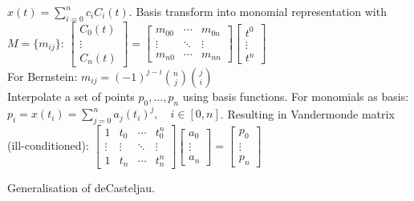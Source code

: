  $x(t) = \sum_{i=0}^nc_iC_i(t)$. Basis transform into monomial representation with $M=\{m_{ij}\}$:
$
\begin{bmatrix}
C_0(t) \\
\vdots \\
C_n(t)
\end{bmatrix}
=
\begin{bmatrix}
m_{00} & \cdots & m_{0n} \\
\vdots & \ddots & \vdots \\
m_{n0} & \cdots & m_{nn}
\end{bmatrix}
\begin{bmatrix}
t^0 \\
\vdots \\
t^n
\end{bmatrix}
$
\\
For Bernstein: $m_{ij} = (-1)^{j-i} \binom{n}{j} \binom{j}{i}$
\\
 Interpolate a set of points $p_0, ..., p_n$ using basis functions. For monomials as basis: $p_i = x(t_i) = \sum_{j=0}^{n} a_j(t_i)^j, \quad i \in [0,n]$. Resulting in Vandermonde matrix (ill-conditioned): 
$
\begin{bmatrix}
1 & t_0 & \cdots & t_0^n \\
\vdots & \vdots & \ddots & \vdots \\
1 & t_n & \cdots & t_n^n
\end{bmatrix}
\begin{bmatrix}
a_0 \\
\vdots \\
a_n
\end{bmatrix}
=
\begin{bmatrix}
p_0 \\
\vdots \\
p_n
\end{bmatrix}
$

 Generalisation of deCasteljau.
